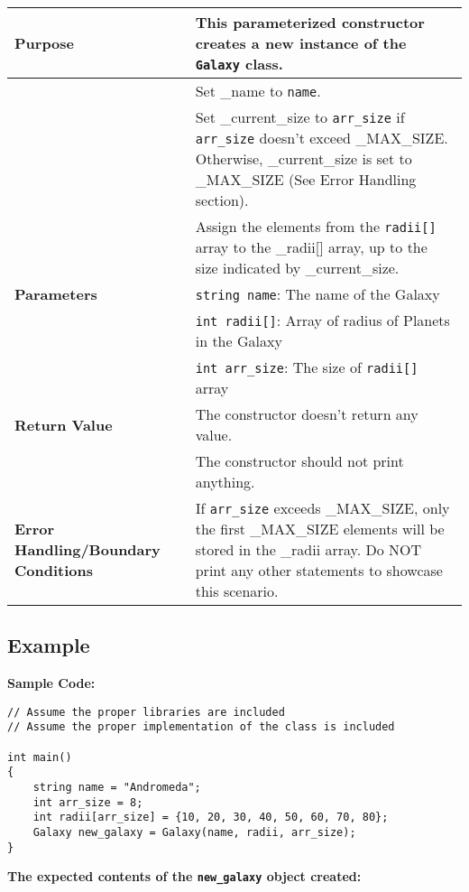 \begin{table}[H]
    \centering
    \begin{tabular}{p{2in}|p{4in}}
        \textbf{Purpose} & This parameterized constructor creates a new instance of the \texttt{Galaxy} class. \\
        \hline
        & Set \_name to \texttt{name}. \\
        & Set \_current\_size to \texttt{arr\_size} if \texttt{arr\_size} doesn't exceed \_MAX\_SIZE. Otherwise, \_current\_size is set to \_MAX\_SIZE (See Error Handling section). \\
        & Assign the elements from the \texttt{radii[]} array to the \_radii[] array, up to the size indicated by \_current\_size. \\
        \hline
        \textbf{Parameters} & \texttt{string name}: The name of the Galaxy \\
        & \texttt{int radii[]}: Array of radius of Planets in the Galaxy \\
        & \texttt{int arr\_size}: The size of \texttt{radii[]} array \\
        \hline
        \textbf{Return Value} & The constructor doesn't return any value. \\
        & The constructor should not print anything. \\
        \hline
        \textbf{Error Handling/Boundary Conditions} & If \texttt{arr\_size} exceeds \_MAX\_SIZE, only the first \_MAX\_SIZE elements will be stored in the \_radii array. Do NOT print any other statements to showcase this scenario. \\
    \end{tabular}
\end{table}

\subsection*{Example}

\textbf{Sample Code:}

\begin{verbatim}
// Assume the proper libraries are included
// Assume the proper implementation of the class is included

int main()
{
    string name = "Andromeda";
    int arr_size = 8;
    int radii[arr_size] = {10, 20, 30, 40, 50, 60, 70, 80};
    Galaxy new_galaxy = Galaxy(name, radii, arr_size);
}
\end{verbatim}

\textbf{The expected contents of the \texttt{new\_galaxy} object created:}

